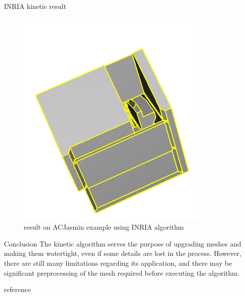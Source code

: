 \documentclass[10pt]{beamer}
\begin{document}
\begin{frame}{INRIA kinetic result }
\begin{figure}[H]
\begin{minipage}[t]{0.35\textwidth}
            \includegraphics[width=\textwidth]{../../images/screen_kinetic/ACJasmin_result_INRIA.png}
            \caption*{result}
          \end{minipage}
          \caption{result on ACJasmin example using INRIA algorithm}
      \end{figure}  
\end{frame}

\begin{frame}{Conclusion}
    The kinetic algorithm serves the purpose of upgrading meshes and making them watertight,
    even if some details are lost in the process. However, there are still many limitations regarding its application, and there may be significant preprocessing of the mesh required before executing the algorithm.
\end{frame}


\begin{frame}[allowframebreaks]{reference}
    \nocite{*}
    
    
\end{frame}
\end{document}
